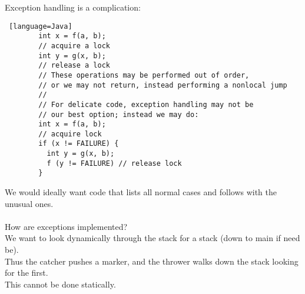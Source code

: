 \documentclass[../../lecture_notes.tex]{subfiles}
\begin{document}
Exception handling is a complication:
\begin{lstlisting} [language=Java]
		int x = f(a, b);
		// acquire a lock
		int y = g(x, b);
		// release a lock
		// These operations may be performed out of order, 
		// or we may not return, instead performing a nonlocal jump
		//
		// For delicate code, exception handling may not be 
		// our best option; instead we may do:
		int x = f(a, b);
		// acquire lock
		if (x != FAILURE) {
		  int y = g(x, b);
		  f (y != FAILURE) // release lock
		}
\end{lstlisting}
We would ideally want code that lists all normal cases and follows with the unusual ones.\\
\\
How are exceptions implemented?\\
\indent We want to look dynamically through the stack for a stack (down to main if need be).\\
\indent Thus the catcher pushes a marker, and the thrower walks down the stack looking for the first.\\
\indent This cannot be done statically.
\end{document}
